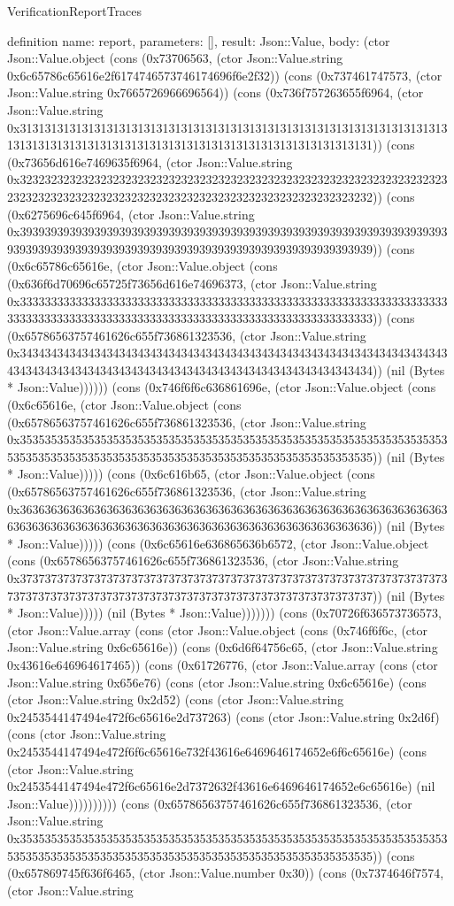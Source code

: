 \begin{lexlean}{VerificationReportTraces}
\begin{semanticmodule}
definition{
  name: report,
  parameters: [],
  result: Json::Value,
  body: (ctor Json::Value.object (cons (0x73706563, (ctor Json::Value.string 0x6c65786c65616e2f6174746573746174696f6e2f32)) (cons (0x737461747573, (ctor Json::Value.string 0x7665726966696564)) (cons (0x736f757263655f6964, (ctor Json::Value.string 0x31313131313131313131313131313131313131313131313131313131313131313131313131313131313131313131313131313131313131313131313131313131)) (cons (0x73656d616e7469635f6964, (ctor Json::Value.string 0x32323232323232323232323232323232323232323232323232323232323232323232323232323232323232323232323232323232323232323232323232323232)) (cons (0x6275696c645f6964, (ctor Json::Value.string 0x39393939393939393939393939393939393939393939393939393939393939393939393939393939393939393939393939393939393939393939393939393939)) (cons (0x6c65786c65616e, (ctor Json::Value.object (cons (0x636f6d70696c65725f73656d616e74696373, (ctor Json::Value.string 0x33333333333333333333333333333333333333333333333333333333333333333333333333333333333333333333333333333333333333333333333333333333)) (cons (0x65786563757461626c655f736861323536, (ctor Json::Value.string 0x34343434343434343434343434343434343434343434343434343434343434343434343434343434343434343434343434343434343434343434343434343434)) (nil (Bytes * Json::Value)))))) (cons (0x746f6f6c636861696e, (ctor Json::Value.object (cons (0x6c65616e, (ctor Json::Value.object (cons (0x65786563757461626c655f736861323536, (ctor Json::Value.string 0x35353535353535353535353535353535353535353535353535353535353535353535353535353535353535353535353535353535353535353535353535353535)) (nil (Bytes * Json::Value))))) (cons (0x6c616b65, (ctor Json::Value.object (cons (0x65786563757461626c655f736861323536, (ctor Json::Value.string 0x36363636363636363636363636363636363636363636363636363636363636363636363636363636363636363636363636363636363636363636363636363636)) (nil (Bytes * Json::Value))))) (cons (0x6c65616e636865636b6572, (ctor Json::Value.object (cons (0x65786563757461626c655f736861323536, (ctor Json::Value.string 0x37373737373737373737373737373737373737373737373737373737373737373737373737373737373737373737373737373737373737373737373737373737)) (nil (Bytes * Json::Value))))) (nil (Bytes * Json::Value))))))) (cons (0x70726f636573736573, (ctor Json::Value.array (cons (ctor Json::Value.object (cons (0x746f6f6c, (ctor Json::Value.string 0x6c65616e)) (cons (0x6d6f64756c65, (ctor Json::Value.string 0x43616e646964617465)) (cons (0x61726776, (ctor Json::Value.array (cons (ctor Json::Value.string 0x656e76) (cons (ctor Json::Value.string 0x6c65616e) (cons (ctor Json::Value.string 0x2d52) (cons (ctor Json::Value.string 0x2453544147494e472f6c65616e2d737263) (cons (ctor Json::Value.string 0x2d6f) (cons (ctor Json::Value.string 0x2453544147494e472f6f6c65616e732f43616e6469646174652e6f6c65616e) (cons (ctor Json::Value.string 0x2453544147494e472f6c65616e2d7372632f43616e6469646174652e6c65616e) (nil Json::Value)))))))))) (cons (0x65786563757461626c655f736861323536, (ctor Json::Value.string 0x35353535353535353535353535353535353535353535353535353535353535353535353535353535353535353535353535353535353535353535353535353535)) (cons (0x657869745f636f6465, (ctor Json::Value.number 0x30)) (cons (0x7374646f7574, (ctor Json::Value.string }
\end{semanticmodule}
\end{lexlean}
